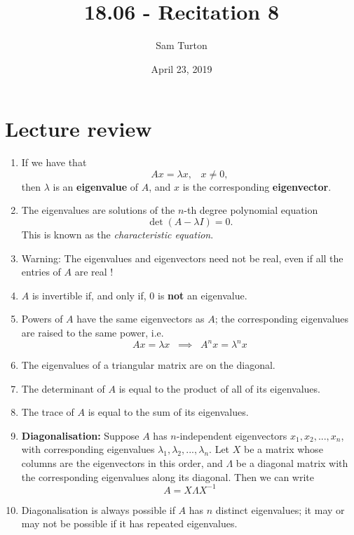 \documentclass[11pt]{article}
\title{18.06 - Recitation 8}
\author{Sam Turton}
\date{April 23, 2019}
\begin{document}
\maketitle

\section{Lecture review}
\begin{enumerate}
\item If we have that
$$Ax = \lambda x, \;\;\; x \neq 0,$$
then $\lambda$ is an \textbf{eigenvalue} of $A$, and $x$ is the corresponding \textbf{eigenvector}. 
\item The eigenvalues are solutions of the $n$-th degree polynomial equation
$$\det (A-\lambda I) = 0.$$
This is known as the \emph{characteristic equation}.
\item Warning: The eigenvalues and eigenvectors need not be real, even if all the entries of $A$ are real !
\item $A$ is invertible if, and only if, $0$ is \textbf{not} an eigenvalue.
\item Powers of $A$ have the same eigenvectors as $A$; the corresponding eigenvalues are raised to the same power, i.e.
$$ Ax = \lambda x \;\; \implies \;\; A^n x = \lambda^n x$$
\item The eigenvalues of a triangular matrix are on the diagonal.
\item The determinant of $A$ is equal to the product of all of its eigenvalues. 
\item The trace of $A$ is equal to the sum of its eigenvalues. 
\item \textbf{Diagonalisation:} Suppose $A$ has $n$-independent eigenvectors $x_1, x_2,...,x_n$, with corresponding eigenvalues $\lambda_1, \lambda_2,...,\lambda_n$. Let $X$ be a matrix whose columns are the eigenvectors in this order, and $\Lambda$ be a diagonal matrix with the corresponding eigenvalues along its diagonal. Then we can write
$$\boxed{A=X\Lambda X^{-1}}$$
\item Diagonalisation is always possible if $A$ has $n$ distinct eigenvalues; it may or may not be possible if it has repeated eigenvalues.
\end{enumerate}

\newpage
\end{document}
